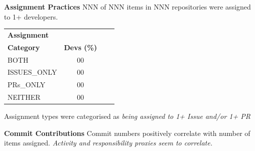 \documentclass[25pt, a0paper, landscape, margin=10mm, innermargin=15mm, blockverticalspace=10mm, subcolspace=7mm, dvipsnames]{tikzposter} %
\begin{document}
\begin{columns}
{\begin{multicols}{2}
{    \textbf{Assignment Practices} \newline  
    NNN of NNN items in NNN repositories were assigned to 1+ developers.   
    \begin{center}
    \begin{tabular}{ l c c c} 
     \textbf{Assignment}\\ \textbf{Category} & \textbf{Devs (\%)} \\
     BOTH & 00 \\ 
     ISSUES\_ONLY & 00 \\
     PRs\_ONLY & 00 \\
     NEITHER & 00 \\ 
    \end{tabular}
    \end{center}
    Assignment types were categorised as \textit{being assigned to 1+ Issue and/or 1+ PR}
    \vspace*{0.4em} 
    \par
    
   
    \textbf{Commit Contributions} \newline 
    Commit numbers positively correlate with number of items assigned. \textit{Activity and responsibility proxies seem to correlate.}
    \vspace*{0.4em} 
    \par
    
}
\end{multicols}}
\end{columns}
\end{document}
